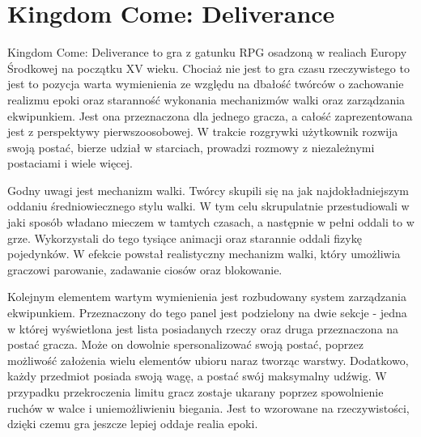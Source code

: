\section{Kingdom Come: Deliverance}

Kingdom Come: Deliverance to gra z gatunku RPG osadzoną w realiach Europy Środkowej na początku XV wieku. Chociaż nie
jest to gra czasu rzeczywistego to jest to pozycja warta wymienienia ze względu na dbałość twórców o zachowanie realizmu
epoki oraz staranność wykonania mechanizmów walki oraz zarządzania ekwipunkiem. Jest ona przeznaczona dla jednego gracza,
a całość zaprezentowana jest z perspektywy pierwszoosobowej. W trakcie rozgrywki użytkownik rozwija swoją postać, bierze
udział w starciach, prowadzi rozmowy z niezależnymi postaciami i wiele więcej.

Godny uwagi jest mechanizm walki. Twórcy skupili się na jak najdokładniejszym oddaniu średniowiecznego stylu walki. W tym
celu skrupulatnie przestudiowali w jaki sposób władano mieczem w tamtych czasach, a następnie w pełni oddali to w grze.
Wykorzystali do tego tysiące animacji oraz starannie oddali fizykę pojedynków. W efekcie powstał realistyczny mechanizm
walki, który umożliwia graczowi parowanie, zadawanie ciosów oraz blokowanie.

Kolejnym elementem wartym wymienienia jest rozbudowany system zarządzania ekwipunkiem. Przeznaczony do tego panel jest
podzielony na dwie sekcje - jedna w której wyświetlona jest lista posiadanych rzeczy oraz druga przeznaczona na postać
gracza. Może on dowolnie spersonalizować swoją postać, poprzez możliwość założenia wielu elementów ubioru naraz tworząc
warstwy.  Dodatkowo, każdy przedmiot posiada swoją wagę, a postać swój maksymalny udźwig. W przypadku przekroczenia limitu
gracz zostaje ukarany poprzez spowolnienie ruchów w walce i uniemożliwieniu biegania. Jest to wzorowane na rzeczywistości,
dzięki czemu gra jeszcze lepiej oddaje realia epoki.
